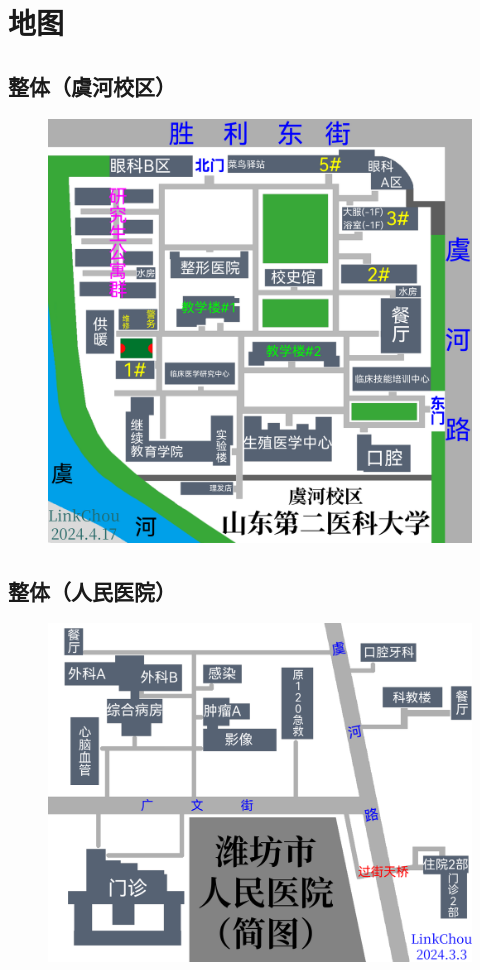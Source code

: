 \newpage
\section[地图]{地图}

\subsection[整体（虞河校区）]{整体（虞河校区）}
\noindent\begin{figure}[H]
    \centering
    \vspace{5em}
    \noindent\includegraphics*[width=\linewidth]{resources/map/虞河校区.pdf}
    \label{map_yuhe_holistic}
\end{figure}

\newpage
\subsection[整体（人民医院）]{整体（人民医院）}
\noindent\begin{figure}[H]
    \centering
    \vspace{10em}
    \noindent\includegraphics*[width=\linewidth]{resources/map/人民医院.pdf}
    \label{map_yuhe_renmin_hospital}
\end{figure}

\newpage